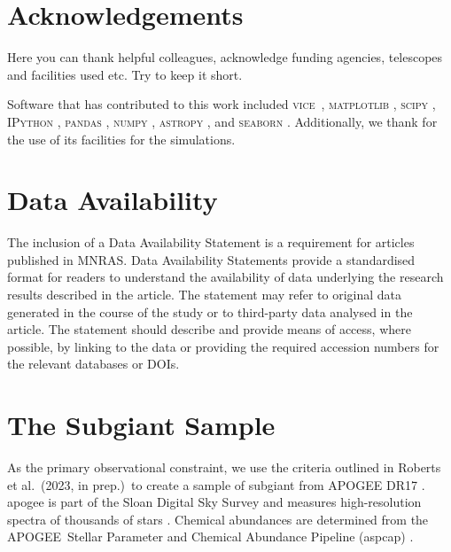 \documentclass[fleqn,usenatbib]{mnras}
\newcommand{\VICE}{\textsc{vice}}
\newcommand{\citetjack}{Roberts et al.~(2023, in prep.)}
\newcommand{\apogee}{APOGEE}
\begin{document}

\section*{Acknowledgements}

 Here you can thank helpful
colleagues, acknowledge funding agencies, telescopes and facilities used etc.
Try to keep it short.

Software that has contributed to this work included  
\VICE~\citep{JW20, james+21},
\textsc{matplotlib} \citep{matplotlib},
\textsc{scipy} \citep{scipy},
\textsc{IPython} \citep{ipy},
\textsc{pandas} \citep{pandas},
\textsc{numpy} \citep{numpy},
\textsc{astropy} \citep{astropy:2013, astropy:2018, astropy:2022},
and 
\textsc{seaborn} \citep{seaborn}
.
Additionally, we thank \citet{OhioSupercomputerCenter1987} for the use of its facilities for the simulations. 


\section*{Data Availability}

 
The inclusion of a Data Availability Statement is a requirement for articles published in MNRAS. Data Availability Statements provide a standardised format for readers to understand the availability of data underlying the research results described in the article. The statement may refer to original data generated in the course of the study or to third-party data analysed in the article. The statement should describe and provide means of access, where possible, by linking to the data or providing the required accession numbers for the relevant databases or DOIs.







\appendix


\section{The Subgiant Sample}\label{sec:jack}

As the primary observational constraint, we use the criteria outlined in \citetjack~to create a sample of subgiant from \apogee{} DR17 \citep{apogee17}. apogee is part of the Sloan Digital Sky Survey and measures high-resolution spectra of thousands of stars \cite{sdss17}. Chemical abundances are determined from the \apogee\ Stellar Parameter and Chemical Abundance Pipeline ({\sc aspcap}) \citep{aspcap}.  
\end{document}
